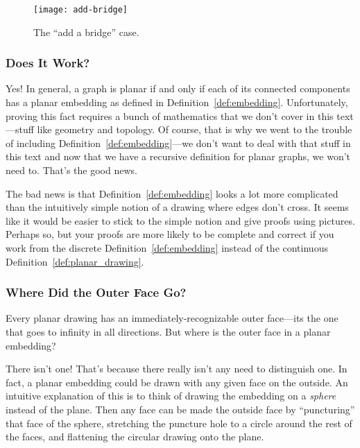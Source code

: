 \begin{definition}
\begin{figure}\redrawn

\texttt{[image: add-bridge]}

\caption{The ``add a bridge'' case.}
\label{fig:add-bridge}
\end{figure}

\end{definition}

\subsubsection{Does It Work?}

Yes!  In general, a graph is planar if and only if each of its
connected components has a planar embedding as defined in
Definition~\ref{def:embedding}.  Unfortunately, proving this fact
requires a bunch of mathematics that we don't cover in this
text---stuff like geometry and topology.  Of course, that is why we
went to the trouble of including Definition~\ref{def:embedding}---we
don't want to deal with that stuff in this text and now that we have a
recursive definition for planar graphs, we won't need to.  That's the
good news.

The bad news is that Definition~\ref{def:embedding} looks a lot more
complicated than the intuitively simple notion of a drawing where
edges don't cross.  It seems like it would be easier to stick to the
simple notion and give proofs using pictures.  Perhaps so, but your
proofs are more likely to be complete and correct if you work from the
discrete Definition~\ref{def:embedding} instead of the continuous
Definition~\ref{def:planar_drawing}.

\subsubsection{Where Did the Outer Face Go?}

Every planar drawing has an immediately-recognizable outer face---its
the one that goes to infinity in all directions.  But where is the
outer face in a planar embedding?

There isn't one!  That's because there really isn't any need to
distinguish one.  In fact, a planar embedding could be drawn with any
given face on the outside.  An intuitive explanation of this is to
think of drawing the embedding on a \emph{sphere} instead of the
plane.  Then any face can be made the outside face by ``puncturing''
that face of the sphere, stretching the puncture hole to a circle
around the rest of the faces, and flattening the circular drawing onto
the plane.

